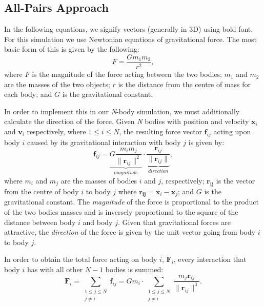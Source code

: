 \subsection{All-Pairs Approach}

In the following equations, we signify vectors (generally in 3D) using bold font. For this simulation we use Newtonian equations of gravitational force. The most basic form of this is given by the following:
\[ 
    F=\frac{Gm_{1}m_{2}}{r^2}, 
\]
where $F$ is the magnitude of the force acting between the two bodies; $m_{1}$ and $m_{2}$ are the masses of the two objects; $r$ is the distance from the centre of mass for each body; and $G$ is the gravitational constant. 

In order to implement this in our {\slshape N\/}-body simulation, we must additionally calculate the direction of the force. Given {\slshape N\/} bodies with position and velocity $\mathbf{x}_i$ and $\mathbf{v}_i$ respectively, where $1\leq i\leq N$, the resulting force vector $\mathbf{f}_{ij}$ acting upon body $i$ caused by its gravitational interaction with body $j$ is given by:
\[
    \mathbf{f}_{ij}=\underbrace{G\frac{m_{i}m_{j}}{\|\mathbf{r}_{ij}\|^2}}_{magnitude} \cdot \underbrace{\frac{\mathbf{r}_{ij}}{\|\mathbf{r}_{ij}\|}}_{direction},
\]
where $m_{i}$ and $m_{j}$ are the masses of bodies $i$ and $j$, respectively; $\mathbf{r_{ij}}$ is the vector from the centre of body $i$ to body $j$ where $\mathbf{r_{ij}}=\mathbf{x}_i - \mathbf{x}_j$; and $G$ is the gravitational constant. The {\itshape magnitude\/} of the force is proportional to the product of the two bodies masses and is inversely proportional to the square of the distance between body $i$ and body $j$. Given that gravitational forces are attractive, the {\itshape direction\/} of the force is given by the unit vector going from body $i$ to body $j$.

In order to obtain the total force acting on body $i$, $\mathbf{F}_i$, every interaction that body $i$ has with all other $N-1$ bodies is summed:
\[
    \mathbf{F}_i=\sum\limits_{\substack{1\leq j\leq N \\ j\neq i }}\mathbf{f}_{ij}=Gm_{i}\cdot \sum\limits_{\substack{1\leq j\leq N \\ j\neq i }}\frac{m_{j}\mathbf{r}_{ij}}{\|\mathbf{r}_{ij}\|^3}.
\]

